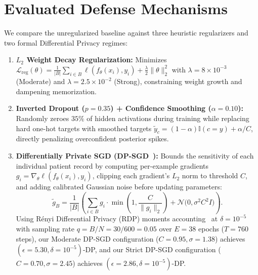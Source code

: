 \documentclass[10pt,twocolumn]{article}
\begin{document}
\section{Evaluated Defense Mechanisms}
We compare the unregularized baseline against three heuristic regularizers and two formal Differential Privacy regimes:
\begin{enumerate}
    \item \textbf{$L_2$ Weight Decay Regularization:} Minimizes $\mathcal{L}_{\text{reg}}(\theta) = \frac{1}{|B|}\sum_{i\in B} \ell(f_\theta(x_i), y_i) + \frac{\lambda}{2}\|\theta\|_2^2$ with $\lambda = 8\times 10^{-3}$ (Moderate) and $\lambda = 2.5\times 10^{-2}$ (Strong), constraining weight growth and dampening memorization.
    \item \textbf{Inverted Dropout ($p=0.35$) + Confidence Smoothing ($\alpha=0.10$):} Randomly zeroes $35\%$ of hidden activations during training while replacing hard one-hot targets with smoothed targets $\tilde{y}_c = (1-\alpha)\mathbb{I}(c=y) + \alpha/C$, directly penalizing overconfident posterior spikes.
    \item \textbf{Differentially Private SGD (DP-SGD~\cite{abadi2016deep}):} Bounds the sensitivity of each individual patient record by computing per-example gradients $g_i = \nabla_\theta \ell(f_\theta(x_i), y_i)$, clipping each gradient's $L_2$ norm to threshold $C$, and adding calibrated Gaussian noise before updating parameters:
    \begin{equation}
        \tilde{g}_B = \frac{1}{|B|} \left( \sum_{i \in B} g_i \cdot \min\left(1, \frac{C}{\|g_i\|_2}\right) + \mathcal{N}\big(0, \sigma^2 C^2 I\big) \right).
    \end{equation}
    Using R\'enyi Differential Privacy (RDP) moments accounting~\cite{mironov2017renyi} at $\delta = 10^{-5}$ with sampling rate $q = B/N = 30/600 = 0.05$ over $E=38$ epochs ($T=760$ steps), our Moderate DP-SGD configuration ($C=0.95, \sigma=1.38$) achieves $(\epsilon = 5.30, \delta = 10^{-5})$-DP, and our Strict DP-SGD configuration ($C=0.70, \sigma=2.45$) achieves $(\epsilon = 2.86, \delta = 10^{-5})$-DP.
\end{enumerate}
\end{document}

